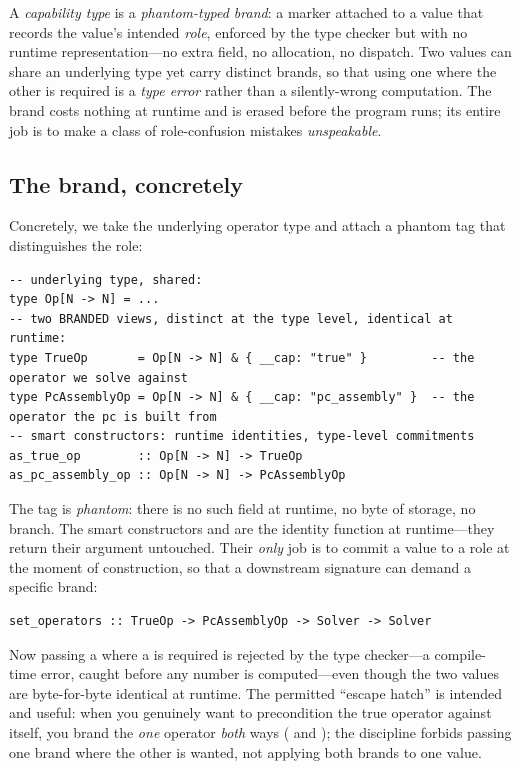 \begin{keyidea}
A \emph{capability type} is a \emph{phantom-typed brand}: a marker attached to a value
that records the value's intended \emph{role}, enforced by the type checker but with
no runtime representation---no extra field, no allocation, no dispatch. Two values can
share an underlying type yet carry distinct brands, so that using one where the other
is required is a \emph{type error} rather than a silently-wrong computation. The brand
costs nothing at runtime and is erased before the program runs; its entire job is to
make a class of role-confusion mistakes \emph{unspeakable}.
\end{keyidea}

\subsection{The brand, concretely}

Concretely, we take the underlying operator type and attach a phantom tag that
distinguishes the role:

\begin{lstlisting}[style=l4style]
-- underlying type, shared:
type Op[N -> N] = ...
-- two BRANDED views, distinct at the type level, identical at runtime:
type TrueOp       = Op[N -> N] & { __cap: "true" }         -- the operator we solve against
type PcAssemblyOp = Op[N -> N] & { __cap: "pc_assembly" }  -- the operator the pc is built from
-- smart constructors: runtime identities, type-level commitments
as_true_op        :: Op[N -> N] -> TrueOp
as_pc_assembly_op :: Op[N -> N] -> PcAssemblyOp
\end{lstlisting}

\noindent The tag  is \emph{phantom}: there is no such field at runtime,
no byte of storage, no branch. The smart constructors  and
 are the identity function at runtime---they return their
argument untouched. Their \emph{only} job is to commit a value to a role at the moment
of construction, so that a downstream signature can demand a specific brand:

\begin{lstlisting}[style=l4style]
set_operators :: TrueOp -> PcAssemblyOp -> Solver -> Solver
\end{lstlisting}

\noindent Now passing a  where a  is required is
rejected by the type checker---a compile-time error, caught before any number is
computed---even though the two values are byte-for-byte identical at runtime. The
permitted ``escape hatch'' is intended and useful: when you genuinely want to
precondition the true operator against itself, you brand the \emph{one} operator
\emph{both} ways ( and ); the
discipline forbids passing one brand where the other is wanted, not applying both
brands to one value.


